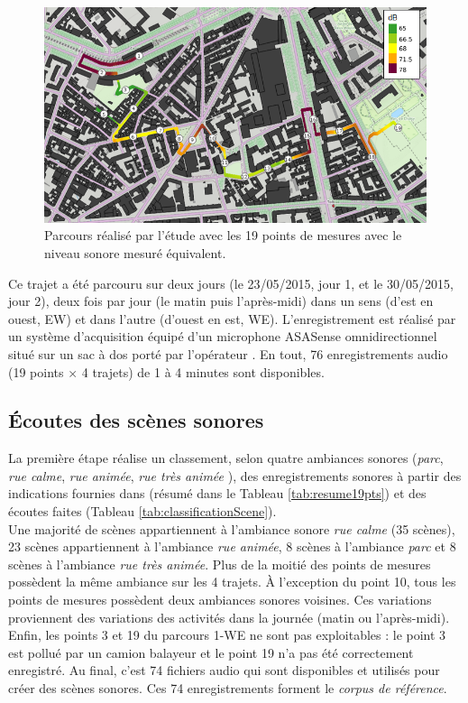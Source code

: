 \begin{figure}[hbtp]
\centering
\includegraphics[width=.7\textwidth]{./figures/grafic/trajet_19pts.png}
\caption{Parcours réalisé par l'étude avec les 19 points de mesures avec le niveau sonore mesuré équivalent.}
\label{fig:parcoursGRAFIC}
\end{figure}

Ce trajet a été parcouru sur deux jours (le 23/05/2015, jour 1, et le 30/05/2015, jour 2), deux fois par jour (le matin puis l'après-midi) dans un sens (d'est en ouest, EW) et dans l'autre (d'ouest en est, WE). L'enregistrement est réalisé par un système d'acquisition équipé d'un microphone ASASense omnidirectionnel situé sur un sac à dos porté par l'opérateur \cite{aumond2017modeling}. En tout, 76 enregistrements audio (19 points $\times$ 4 trajets) de 1 à 4 minutes sont disponibles. \\




\subsection{Écoutes des scènes sonores}

La première étape réalise un classement, selon quatre ambiances sonores (\textit{parc}, \textit{rue calme}, \textit{rue animée}, \textit{rue très animée} \cite{can_describing_2015}), des enregistrements sonores à partir des indications fournies dans \cite{aumond2017modeling} (résumé dans le Tableau \ref{tab:resume19pts}) et des écoutes faites (Tableau \ref{tab:classificationScene}).\\



Une majorité de scènes appartiennent à l'ambiance sonore \textit{rue calme} (35 scènes), 23 scènes appartiennent à l'ambiance \textit{rue animée}, 8 scènes à l'ambiance \textit{parc} et 8 scènes à l'ambiance \textit{rue très animée}. Plus de la moitié des points de mesures possèdent la même ambiance sur les 4 trajets. À l'exception du point 10, tous les points de mesures possèdent deux ambiances sonores voisines. Ces variations proviennent des variations des activités dans la journée (matin ou l'après-midi). Enfin, les points 3 et 19 du parcours 1-WE ne sont pas exploitables : le point 3 est pollué par un camion balayeur et le point 19 n'a pas été correctement enregistré. Au final, c'est 74 fichiers audio qui sont disponibles et utilisés pour créer des scènes sonores. Ces 74 enregistrements forment le \textit{corpus de référence}.


